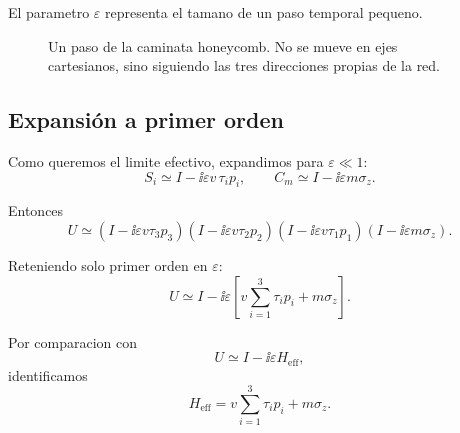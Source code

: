 El parametro \(\varepsilon\) representa el tamano de un paso temporal pequeno.

\begin{figure}[ht]
\centering
{}
\caption{Un paso de la caminata honeycomb. No se mueve en ejes cartesianos, sino siguiendo las tres direcciones propias de la red.}
\label{c03:fig:step-sequence}
\end{figure}

\subsection{Expansión a primer orden}

Como queremos el limite efectivo, expandimos para \(\varepsilon\ll 1\):
\begin{equation}
S_i \simeq I - \ii \varepsilon v\, \tau_i p_i,
\qquad
C_m \simeq I - \ii \varepsilon m \sigma_z.
\end{equation}

Entonces
\begin{equation}
U \simeq
\left(I-\ii \varepsilon v \tau_3 p_3\right)
\left(I-\ii \varepsilon v \tau_2 p_2\right)
\left(I-\ii \varepsilon v \tau_1 p_1\right)
\left(I-\ii \varepsilon m \sigma_z\right).
\end{equation}

Reteniendo solo primer orden en \(\varepsilon\):
\begin{equation}
U \simeq I - \ii \varepsilon
\left[
v\sum_{i=1}^3 \tau_i p_i + m \sigma_z
\right].
\label{c03:eq:Uexp}
\end{equation}

Por comparacion con
\begin{equation}
U \simeq I - \ii \varepsilon H_{\text{eff}},
\end{equation}
identificamos
\begin{equation}
H_{\text{eff}} =
v\sum_{i=1}^3 \tau_i p_i + m \sigma_z.
\label{c03:eq:Heffraw}
\end{equation}

